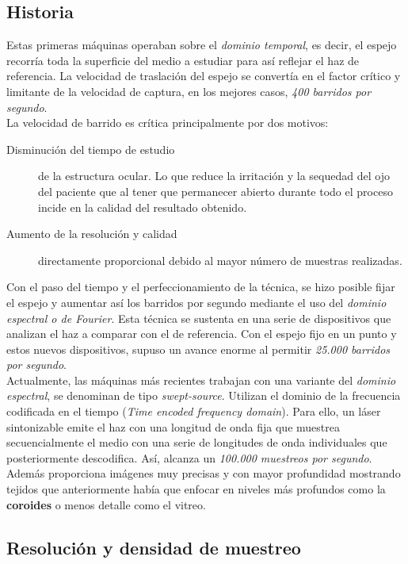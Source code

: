 \subsection{Historia}
Estas primeras máquinas operaban sobre el \emph{dominio temporal}, es decir,
el espejo recorría toda la superficie del medio a estudiar para así
reflejar el haz de referencia. La velocidad de traslación del espejo
se convertía en el factor crítico y limitante de la velocidad de
captura, en los mejores casos, \emph{400 barridos por segundo}.\\
La velocidad de barrido es crítica principalmente por dos motivos:
\begin{description}
\item [Disminución del tiempo de estudio] de la estructura ocular. Lo
  que reduce la irritación y la sequedad del ojo del paciente que al
  tener que permanecer abierto durante todo el proceso incide en la
  calidad del resultado obtenido.
\item [Aumento de la resolución y calidad] directamente proporcional
  debido al mayor número de muestras realizadas.
\end{description}
Con el paso del tiempo y el perfeccionamiento de la técnica, se hizo
posible fijar el espejo y aumentar así los barridos por segundo
mediante el uso del \emph{dominio espectral o de Fourier}. Esta
técnica se sustenta en una serie de dispositivos que analizan el haz a
comparar con el de referencia. Con el espejo fijo en un punto y estos
nuevos dispositivos, supuso un avance enorme al permitir \emph{25.000
  barridos por segundo}.\\
Actualmente, las máquinas más recientes trabajan con una variante del
\emph{dominio espectral}, se denominan de tipo
\emph{swept-source}. Utilizan el dominio de la frecuencia codificada
en el tiempo (\emph{Time encoded frequency domain}). Para ello, un
láser sintonizable emite el haz con una longitud de onda fija que
muestrea secuencialmente el medio con una serie de longitudes de onda
individuales que posteriormente descodifica. Así, alcanza un
\emph{100.000 muestreos por segundo}. Además proporciona imágenes muy
precisas y con mayor profundidad mostrando tejidos que anteriormente
había que enfocar en niveles más profundos como la \textbf{coroides} o
menos detalle como el vitreo.

\subsection{Resolución y densidad de muestreo}

